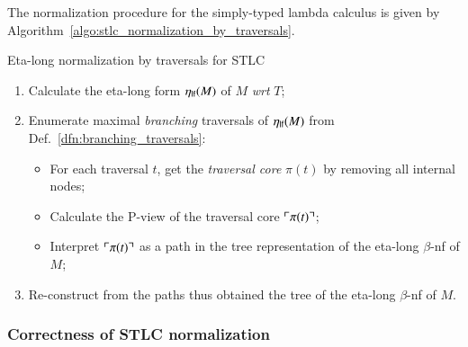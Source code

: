 \documentclass{elsarticle}
\theoremstyle{plain}
\theoremstyle{definition}
\theoremstyle{remark}
\def\coresymbol{\pi} %
\newcommand{\core}[1]{\coresymbol(#1)} %
\begin{document}
The normalization procedure for the simply-typed lambda calculus is given by Algorithm~\ref{algo:stlc_normalization_by_traversals}.

\begin{algorithm}[!ht]
\caption{Eta-long normalization by traversals for STLC}
\label{algo:stlc_normalization_by_traversals}
\begin{algorithmic}
\begin{enumerate}[nosep]
  \item Calculate the eta-long form $\eta_{\sf lf}(M)$ of $M$ \emph{wrt} $T$;
  \item Enumerate maximal \emph{branching} traversals of $\eta_{\sf lf}(M)$ from Def.~\ref{dfn:branching_traversals}:
  \begin{itemize}[nosep]
  \item For each traversal $t$, get the \emph{traversal core} $\core{t}$ by removing all internal nodes;
  \item Calculate the P-view of the traversal core $\pview{\core{t}}$;
  \item Interpret $\pview{\core{t}}$ as a path in the tree representation of the eta-long $\beta$-nf of $M$;
  \end{itemize}
  \item Re-construct from the paths thus obtained the tree of the eta-long $\beta$-nf of $M$.
\end{enumerate}
\end{algorithmic}
\end{algorithm}

\subsubsection*{Correctness of STLC normalization}

\end{document}
